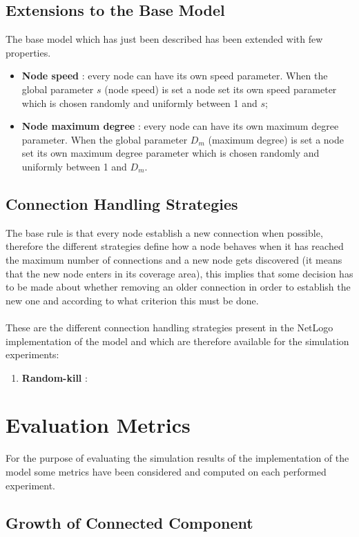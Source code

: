 \documentclass{llncs}
\begin{document}
\subsection{Extensions to the Base Model}
The base model which has just been described has been extended with few properties.\\
\begin{itemize}
	\item \textbf{Node speed} : every node can have its own speed parameter. When the global parameter $s$ (node speed) is set a node set its own speed parameter which is chosen randomly and uniformly between 1 and $s$;\\
	\item \textbf{Node maximum degree} : every node can have its own maximum degree parameter. When the global parameter $D_{m}$ (maximum degree) is set a node set its own maximum degree parameter which is chosen randomly and uniformly between 1 and $D_{m}$.
\end{itemize}
%
\subsection{Connection Handling Strategies}
%
The base rule is that every node establish a new connection when possible, therefore the different strategies define how a node behaves when it has reached the maximum number of connections and a new node gets discovered (it means that the new node enters in its coverage area), this implies that some decision has to be made about whether removing an older connection in order to establish the new one and according to what criterion this must be done.\\\\
%
These are the different connection handling strategies present in the NetLogo implementation of the model and which are therefore available for the simulation experiments:
\begin{enumerate}
	\item \textbf{Random-kill} : 
\end{enumerate}
\section{Evaluation Metrics}
For the purpose of evaluating the simulation results of the implementation of the model some metrics have been considered and computed on each performed experiment.\\
%
\subsection{Growth of Connected Component}
\end{document}
